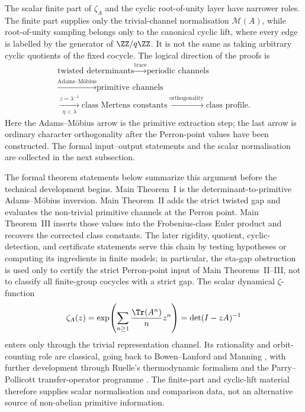The scalar finite part of \(\zeta_A\) and the cyclic root-of-unity layer
have narrower roles. The finite part supplies only the trivial-channel
normalisation \(\mathcal M(A)\), while root-of-unity sampling belongs
only to the canonical cyclic lift, where every edge is labelled by the
generator of \(\ZZ/q\ZZ\). It is not the same as taking arbitrary cyclic
quotients of the fixed cocycle. The logical direction of the proofs is
\[
  \begin{array}{c}
    \text{twisted determinants}
    \xrightarrow{\text{trace}}
    \text{periodic channels} \\[2pt]
    \xrightarrow{\text{Adams--M\"obius}}
    \text{primitive channels} \\[2pt]
    \xrightarrow[\eta<\lambda]{z=\lambda^{-1}}
    \text{class Mertens constants}
    \xrightarrow{\text{orthogonality}}
    \text{class profile}.
  \end{array}
\]
Here the Adams--M\"obius arrow is the primitive extraction step; the last
arrow is ordinary character orthogonality after the Perron-point values
have been constructed. The formal input--output statements and the scalar
normalisation are collected in the next subsection.

The formal theorem statements below summarize this argument before the
technical development begins.  Main Theorem~I is the determinant-to-primitive
Adams--M\"obius inversion.  Main Theorem~II adds the strict twisted gap
and evaluates the non-trivial primitive channels at the Perron point.
Main Theorem~III inserts those values into the Frobenius-class Euler
product and recovers the corrected class constants.  The later rigidity,
quotient, cyclic-detection, and certificate statements serve
this chain by testing hypotheses or computing its ingredients in finite
models; in particular, the eta-gap obstruction is used only to certify the
strict Perron-point input of Main Theorems~II--III, not to classify all
finite-group cocycles with a strict gap.  The scalar dynamical \(\zeta\)-function
\[
  \zeta_A(z)
  =\exp\!\left(\sum_{n\ge 1}\frac{\Tr(A^n)}{n}z^n\right)
  =\det(I-zA)^{-1}
\]
enters only through the trivial representation channel. Its rationality
and orbit-counting role are classical, going back to
Bowen--Lanford \cite{BowenLanford1970Zeta} and Manning
\cite{Manning1971Axiom}, with further development through Ruelle's
thermodynamic formalism
\cite{Ruelle1976ZetaExpanding,Ruelle1978Thermodynamic} and the
Parry--Pollicott transfer-operator programme
\cite{ParryPollicott1990Zeta}. The finite-part and cyclic-lift material
therefore supplies scalar normalisation and comparison data, not an
alternative source of non-abelian primitive information.

